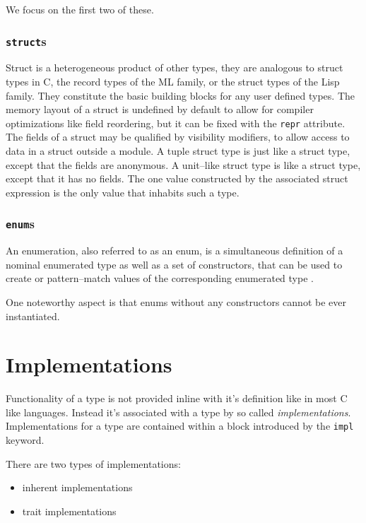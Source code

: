 We focus on the first two of these.

\subsubsection{\texttt{struct}s}

Struct is a heterogeneous product of other types, they are analogous to struct types in C, the record types of the ML family, or the struct types of the Lisp family. 
They constitute the basic building blocks for any user defined types. The memory layout of a struct is undefined by default to allow for compiler optimizations like field reordering, 
but it can be fixed with the \texttt{repr} attribute. The fields of a struct may be qualified by visibility modifiers, to allow access to data in a struct outside a module.
A tuple struct type is just like a struct type, except that the fields are anonymous. 
A unit--like struct type is like a struct type, except that it has no fields. The one value constructed by the associated struct expression is the only value that inhabits such a type.
\cite{rustrefernce}

\subsubsection{\texttt{enum}s}

An enumeration, also referred to as an enum, is a simultaneous definition of a nominal enumerated type as well as a set of constructors, 
that can be used to create or pattern--match values of the corresponding enumerated type \cite{rustrefernce}.

One noteworthy aspect is that enums without any constructors cannot be ever instantiated.

\section{Implementations}

Functionality of a type is not provided inline with it's definition like in most C like languages. 
Instead it's associated with a type by so called \textit{implementations}.
Implementations for a type are contained within a block introduced by the \texttt{impl} keyword.

There are two types of implementations:
\begin{itemize}
    \item inherent implementations
    \item trait implementations
\end{itemize}


